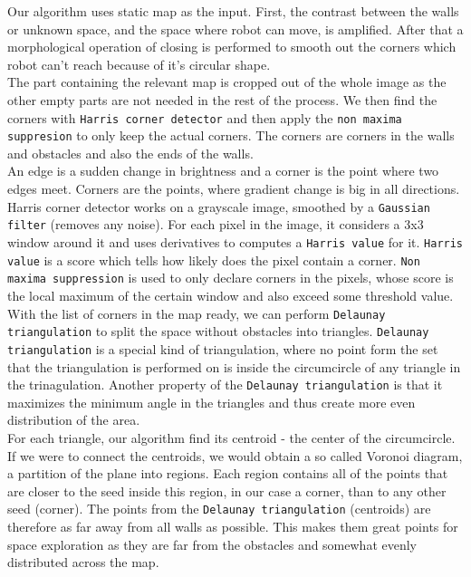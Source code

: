 \documentclass[12pt,a4paper]{article}
\begin{document}
	Our algorithm uses static map as the input. First, the contrast between the walls or unknown space, and the space where robot can move, is amplified. After that a morphological operation of closing is performed to smooth out the corners which robot can't reach because of it's circular shape. \\
	
	The part containing the relevant map is cropped out of the whole image as the other empty parts are not needed in the rest of the process. We then find the corners with \texttt{Harris corner detector} and then apply the \texttt{non maxima suppresion} to only keep the actual corners. The corners are corners in the walls and obstacles and also the ends of the walls. \\
	
	An edge is a sudden change in brightness and a corner is the point where two edges meet. Corners are the points, where gradient change is big in all directions. Harris corner detector works on a grayscale image, smoothed by a \texttt{Gaussian filter} (removes any noise). For each pixel in the image, it considers a 3x3 window around it and uses derivatives to computes a \texttt{Harris value} for it. \texttt{Harris value} is a score which tells how likely does the pixel contain a corner. \texttt{Non maxima suppression} is used to only declare corners in the pixels, whose score is the local maximum of the certain window and also exceed some threshold value. \\

	With the list of corners in the map ready, we can perform \texttt{Delaunay triangulation} to split the space without obstacles into triangles. \texttt{Delaunay triangulation} is a special kind of triangulation, where  no point form the set that the triangulation is performed on is inside the circumcircle of any triangle in the trinagulation. Another property of the \texttt{Delaunay triangulation} is that it maximizes the minimum angle in the triangles and thus create more even distribution of the area. \\

	For each triangle, our algorithm find its centroid - the center of the circumcircle. If we were to connect the centroids, we would obtain a so called Voronoi diagram, a partition of the plane into regions. Each region contains all of the points that are closer to the seed inside this region, in our case a corner, than to any other seed (corner). The points from the \texttt{Delaunay triangulation} (centroids) are therefore as far away from all walls as possible. This makes them great points for space exploration as they are far from the obstacles and somewhat evenly distributed across the map. \\
\end{document}
